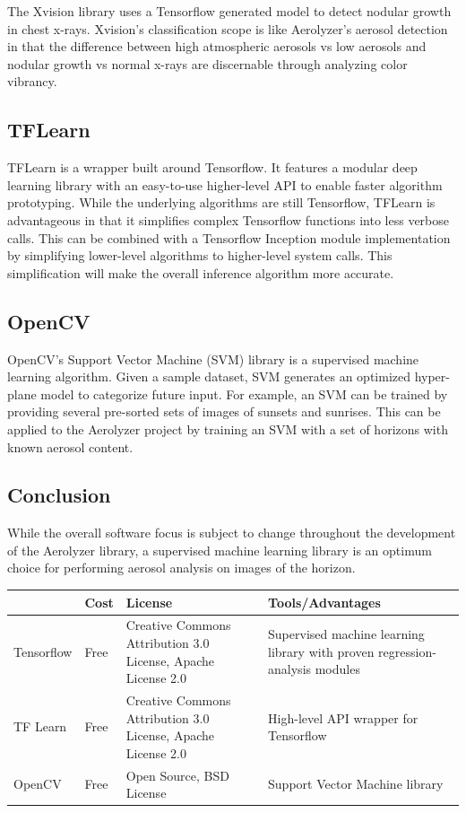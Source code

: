\documentclass[onecolumn, draftclsnofoot,10pt, compsoc]{IEEEtran}
\begin{document}
\begin{singlespace}
		
		The Xvision library uses a Tensorflow generated model to detect nodular growth in chest x-rays.
		Xvision’s classification scope is like Aerolyzer’s aerosol detection in that the difference between high atmospheric aerosols vs low aerosols and nodular growth vs normal x-rays are discernable through analyzing color vibrancy. \cite{xvision}

	\subsection{TFLearn}
		TFLearn is a wrapper built around Tensorflow.
		It features a modular deep learning library with an easy-to-use higher-level API to enable faster algorithm prototyping.
		While the underlying algorithms are still Tensorflow, TFLearn is advantageous in that it simplifies complex Tensorflow functions into less verbose calls.
		This can be combined with a Tensorflow Inception module implementation by simplifying lower-level algorithms to higher-level system calls.
		This simplification will make the overall inference algorithm more accurate. \cite{TFLearn}

	\subsection{OpenCV}
		OpenCV's Support Vector Machine (SVM) library is a supervised machine learning algorithm.
		Given a sample dataset, SVM generates an optimized hyper-plane model to categorize future input.
		For example, an SVM can be trained by providing several pre-sorted sets of images of sunsets and sunrises.
		This can be applied to the Aerolyzer project by training an SVM with a set of horizons with known aerosol content. \cite{svm}

	\subsection{Conclusion}
		While the overall software focus is subject to change throughout the development of the Aerolyzer library, a supervised machine learning library is an optimum choice for performing aerosol analysis on images of the horizon.
		\begin{center}
			\begin{tabular}{|l|p{3cm}|p{5cm}|p{5cm}|}
				\hline \textbf{} & \textbf{Cost} & \textbf{License} & \textbf{Tools/Advantages} \\\hline
				Tensorflow & Free & Creative Commons Attribution 3.0 License, Apache License 2.0 & Supervised machine learning library with proven regression-analysis modules\\\hline
				TF Learn & Free & Creative Commons Attribution 3.0 License, Apache License 2.0 & High-level API wrapper for Tensorflow\\\hline
				OpenCV & Free & Open Source, BSD License & Support Vector Machine library\\\hline
			\end{tabular}
		\end{center}


\end{singlespace}
\end{document}
